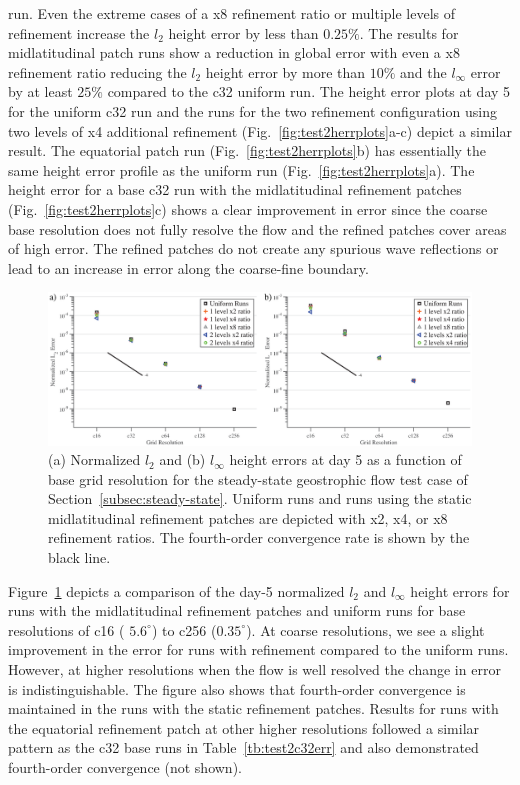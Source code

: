 run.  Even the extreme cases of a x8 refinement ratio or multiple levels
of refinement increase the $l_2$ height error by less than $0.25\%$.
The results for midlatitudinal patch runs show a reduction in global
error with even a x8 refinement ratio reducing the $l_2$ height error
by more than $10\%$ and the $l_\infty$ error by at least $25\%$
compared to the c32 uniform run.  The height error plots at day 5 for
the uniform c32 run and the runs for the two refinement configuration
using two levels of x4 additional refinement
(Fig.~\ref{fig:test2herrplots}a-c) depict a similar result.  The equatorial
patch run
(Fig.~\ref{fig:test2herrplots}b) has essentially the same height error profile
as the uniform run
(Fig.~\ref{fig:test2herrplots}a).  The height error for a base c32 run with
the midlatitudinal refinement patches
(Fig.~\ref{fig:test2herrplots}c) shows a clear improvement in error since the
coarse base resolution does not fully resolve the flow and the refined
patches cover areas of high error.  The refined patches do not create
any spurious wave reflections or lead to an increase in error along the
coarse-fine boundary.
%
\begin{figure}
    \centerline{%
    \noindent
    \includegraphics[width=\textwidth]{Chap1/final_Test2_errvsgrids_combo.eps}}
    \caption{(a) Normalized $l_2$ and (b) $l_\infty$ height errors
    at day 5 as a function of base grid resolution for the steady-state
    geostrophic flow test case of
Section~\ref{subsec:steady-state}.
  Uniform runs and runs using the static
    midlatitudinal refinement patches are depicted with x2, x4, or x8
    refinement ratios.  The fourth-order convergence rate is shown by
    the black line.}%
    \label{fig:test2convergeplots}
\end{figure}
%
Figure~\ref{fig:test2convergeplots} depicts a comparison of the day-5 normalized 
$l_2$ and $l_\infty$ height errors for runs with the midlatitudinal
refinement patches and uniform runs for base resolutions of c16 (
$5.6^\circ$) to c256 ($0.35^\circ$). At coarse resolutions, we see a slight
improvement in the error for runs with refinement compared to the
uniform runs. However, at higher resolutions when the flow is well resolved
the change in error is indistinguishable.  The figure also shows that
fourth-order convergence is maintained in the runs with the static
refinement patches.  Results for runs with the equatorial refinement
patch at other higher resolutions followed a similar pattern as the c32
base runs in
Table~\ref{tb:test2c32err} and also demonstrated fourth-order convergence (not shown).

